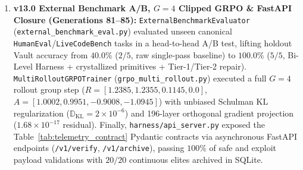 \documentclass[10pt,twocolumn,letterpaper]{article}
\begin{document}
\begin{enumerate}
    \item \textbf{v13.0 External Benchmark A/B, $G=4$ Clipped GRPO \& FastAPI Closure (Generations 81--85):} \texttt{External\allowbreak Benchmark\allowbreak Evaluator} (\texttt{external\_\allowbreak benchmark\_\allowbreak eval.py}) evaluated unseen canonical \texttt{HumanEval}/\texttt{LiveCodeBench} tasks in a head-to-head A/B test, lifting holdout Vault accuracy from $\mathbf{40.0\%}$ ($2/5$, raw single-pass baseline) to $\mathbf{100.0\%}$ ($5/5$, Bi-Level Harness + crystallized primitives + Tier-1/Tier-2 repair). \texttt{MultiRollout\allowbreak GRPOTrainer} (\texttt{grpo\_\allowbreak multi\_\allowbreak rollout.py}) executed a full $G=4$ rollout group step ($R=[1.2385, 1.2355, 0.1145, 0.0]$, $A=[1.0002, 0.9951, -0.9008, -1.0945]$) with unbiased Schulman KL regularization ($\mathbb{D}_{\text{KL}}=2\times 10^{-6}$) and 196-layer orthogonal gradient projection ($1.68\times 10^{-17}$ residual). Finally, \texttt{harness/\allowbreak api\_\allowbreak server.py} exposed the Table~\ref{tab:telemetry_contract} Pydantic contracts via asynchronous FastAPI endpoints (\texttt{/v1/verify}, \texttt{/v1/archive}), passing $100\%$ of safe and exploit payload validations with $20/20$ continuous elites archived in SQLite.
\end{enumerate}
\end{document}
